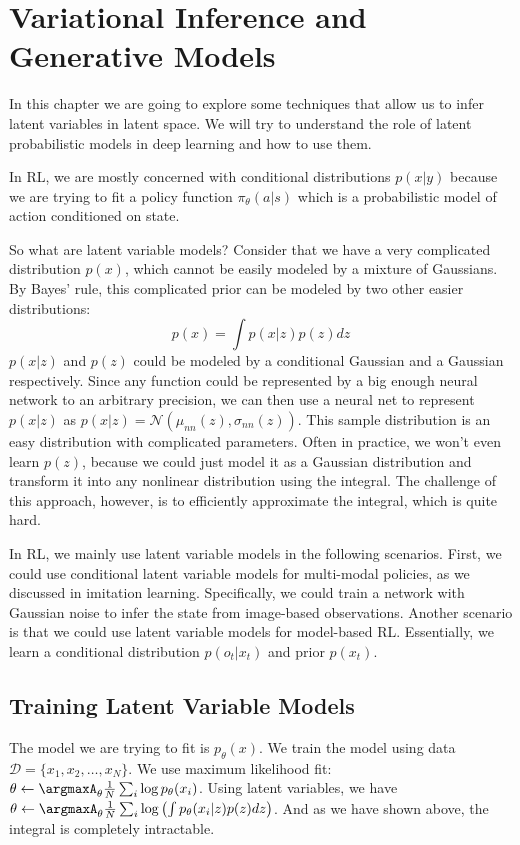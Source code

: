 \chapter{Variational Inference and Generative Models}
In this chapter we are going to explore some techniques that allow us to infer latent variables in latent space. We will try to understand the role of latent probabilistic models in deep learning and how to use them.

In RL, we are mostly concerned with conditional distributions $p(x|y)$ because we are trying to fit a policy function $\pi_\theta(a|s)$ which is a probabilistic model of action conditioned on state. 

So what are latent variable models? Consider that we have a very complicated distribution $p(x)$, which cannot be easily modeled by a mixture of Gaussians. By Bayes' rule, this complicated prior can be modeled by two other easier distributions:
\[
p(x) = \int p(x|z)p(z)dz
\]
$p(x|z)$ and $p(z)$ could be modeled by a conditional Gaussian and a Gaussian respectively. Since any function could be represented by a big enough neural network to an arbitrary precision, we can then use a neural net to represent $p(x|z)$ as $p(x|z) = \mathcal{N}(\mu_{nn}(z),\sigma_{nn}(z))$. This sample distribution is an easy distribution with complicated parameters. Often in practice, we won't even learn $p(z)$, because we could just model it as a Gaussian distribution and transform it into any nonlinear distribution using the integral. The challenge of this approach, however, is to efficiently approximate the integral, which is quite hard.

In RL, we mainly use latent variable models in the following scenarios. First, we could use conditional latent variable models for multi-modal policies, as we discussed in imitation learning. Specifically, we could train a network with Gaussian noise to infer the state from image-based observations. Another scenario is that we could use latent variable models for model-based RL. Essentially, we learn a conditional distribution $p(o_t|x_t)$ and prior $p(x_t)$.

\section{Training Latent Variable Models}
The model we are trying to fit is $p_\theta(x)$. We train the model using data $\mathcal{D} = \{x_1,x_2,\dots,x_N\}$. We use maximum likelihood fit: $\theta\leftarrow \argmaxA_\theta\frac{1}{N}\sum_i\log p_\theta(x_i)$. Using latent variables, we have $\theta\leftarrow \argmaxA_\theta\frac{1}{N}\sum_i\log \left(\int p_\theta(x_i|z)p(z)dz \right)$. And as we have shown above, the integral is completely intractable. 

